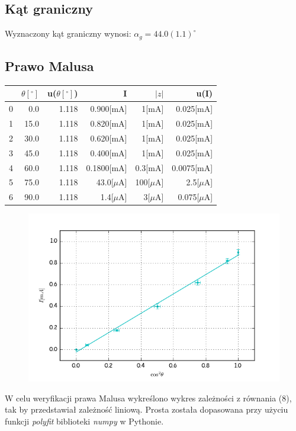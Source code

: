 \documentclass[a4paper,10pt]{article}
\begin{document}
\subsection{Kąt graniczny}
Wyznaczony kąt graniczny wynosi: $\alpha_g = 44.0(1.1)^\circ$

\subsection{Prawo Malusa}
\begin{tabular}{lrrrrr}
\toprule
\hline
{} &$\theta[^\circ]$&u($\theta[^\circ]$)&I&$|z|$&u(I) \\
\midrule
\hline
0 &  0.0 & 1.118 & 0.900[mA] & 1[mA] & 0.025[mA] \\
1 & 15.0 & 1.118 & 0.820[mA] & 1[mA] & 0.025[mA] \\
2 & 30.0 & 1.118 & 0.620[mA] & 1[mA] & 0.025[mA] \\
3 & 45.0 & 1.118 & 0.400[mA] & 1[mA] & 0.025[mA] \\
4 & 60.0 & 1.118 & 0.1800[mA] & 0.3[mA] & 0.0075[mA] \\
5 & 75.0 & 1.118 & 43.0[$\mu$A] & 100[$\mu$A] & 2.5[$\mu$A] \\
6 & 90.0 & 1.118 & 1.4[$\mu$A] &  3[$\mu$A] &  0.075[$\mu$A] \\
\bottomrule
\hline
\end{tabular}

\begin{figure}[H]
  \includegraphics{./malus.png}
  \caption{}
\end{figure}
W celu weryfikacji prawa Malusa wykreślono wykres zależności z równania (8), tak by przedstawiał zależność liniową.
Prosta została dopasowana przy użyciu funkcji \emph{polyfit} biblioteki \emph{numpy} w Pythonie.
\end{document}

